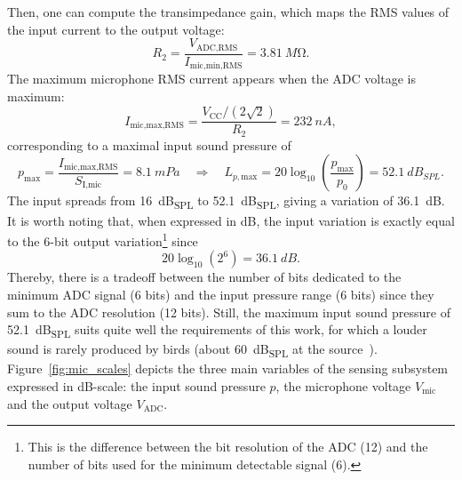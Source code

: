 \documentclass{EPL-master-thesis-covers-EN}
\newcommand{\te}[1]{\textrm{#1}}
\begin{document}
Then, one can compute the transimpedance gain, which maps the RMS values of the input current to the output voltage:
\[
 R_2 = \frac{V_\te{ADC,RMS}}{I_{\te{mic,min,RMS}}} = \SI{3.81}{M\ohm}.
\]
The maximum microphone RMS current appears when the ADC voltage is maximum:
\[
 I_{\te{mic,max,RMS}} = \frac{V_\te{CC}/(2\sqrt{2})}{R_2} = \SI{232}{nA},
\]
corresponding to a maximal input sound pressure of
\[
   p_\te{max} = \frac{I_{\te{mic,max,RMS}}}{S_{\te{I,mic}}} = \SI{8.1}{mPa} \quad \Rightarrow \quad L_{p,\te{max}} = 20\log_{10}\left(\frac{p_\te{max}}{p_0}\right) = \SI{52.1}{dB_{SPL}}.
\]
The input spreads from \SI{16}{dB_{SPL}} to \SI{52.1}{dB_{SPL}}, giving a variation of \SI{36.1}{dB}. It is worth noting that, when expressed in dB, the input variation is exactly equal to the 6-bit output variation\footnote{This is the difference between the bit resolution of the ADC (12) and the number of bits used for the minimum detectable signal (6).} since 
\[
 20\log_{10}\left(2^{6}\right) = \SI{36.1}{dB}.
\]
Thereby, there is a tradeoff between the number of bits dedicated to the minimum ADC signal (6 bits) and the input pressure range (6 bits) since they sum to the ADC resolution (12 bits). Still, the maximum input sound pressure of \SI{52.1}{dB_{SPL}} suits quite well the requirements of this work, for which a louder sound is rarely produced by birds (about \SI{60}{dB_{SPL}} at the source~\cite{10.1007/s00265-009-0743-4}).
Figure~\ref{fig:mic_scales} depicts the three main variables of the sensing subsystem expressed in dB-scale: the input sound pressure $p$, the microphone voltage $V_{\te{mic}}$ and the output voltage $V_\te{ADC}$.
\end{document}
